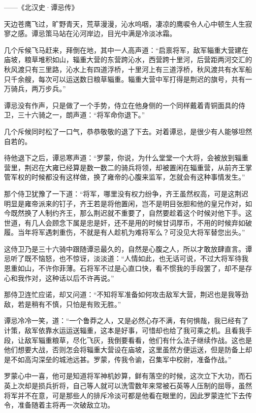 ——《北汉史·谭忌传》

天边苍鹰飞过，旷野青天，荒草漫漫，沁水呜咽，凄凉的鹰唳令人心中顿生人生寂寥之感。谭忌策马站在沁河岸边，目光中满是冷淡冰霜。

几个斥候飞马赶来，拜倒在地，其中一人高声道：“启禀将军，敌军辎重大营建在庙坡，粮草堆积如山，辎重大营的东营跨沁水，西营跨十里河，后营距两河交汇的秋风渡只有三里路，沁水上有四道浮桥，十里河上有三道浮桥，秋风渡共有水军船只千余艘，每次可以运送数日粮草辎重。辎重大营中军打得是荆迟的旗号，共有一万骑兵，两万步兵。”

谭忌没有作声，只是做了一个手势，侍立在他身侧的一个同样戴着青铜面具的侍卫，三十六骑之一，朗声道：“将军命你退下。”

几个斥候同时松了一口气，恭恭敬敬的退了下去。对着谭忌，是很少有人能够坦然自若的。

待他退下之后，谭忌寒声道：“罗蒙，你说，为什么堂堂一个大将，会被放到辎重营里，荆迟在大雍已经算是数一数二的骑兵将领，却被置闲在辎重营，从前齐王掌管军权的时候都没有这样做，换了雍帝的心腹来监军，怎就会有这种事情发生。”

那个侍卫犹豫了一下道：“将军，哪里没有权力纷争，齐王虽然权高，可是这荆迟明显是雍帝派来的钉子，齐王若是将他置闲，岂不是明目张胆和他的皇兄作对，如今既然换了人制约齐王，那么荆迟就不重要了，自然要趁着这个时候对他下手。这世道，有几人会顾念下属是忠是奸，还不是用的时候甘词厚币，不用的时候弃如破履。当年将军遇刺重伤，不就是有人趁机为难将军么？可没见大将军替您出头。”

这侍卫乃是三十六骑中跟随谭忌最久的，自然是心腹之人，所以才敢放肆直言。谭忌听了既不恼怒，也不惊讶，淡淡道：“人情如此，也无话可说，不过大将军待我恩重如山，不许你菲薄。石将军不过是心直口快，看不惯我的手段罢了，却不是存心和我作对，这种话以后不许再说。”

那侍卫连忙应诺，却又问道：“不知将军准备如何攻击敌军大营，荆迟也是我等劲敌，若是稍有不慎，只怕是有败无胜。”

谭忌冷冷一笑，道：“一个鲁莽之人，又是必然心存不满，有何惧哉，我已经有了计策，敌军依靠水运运送辎重，这本是好事，可惜却也给了我可乘之机。且看我手段，让敌军辎重粮草，尽化飞灰，我倒要看看，他们有什么法子继续作战。这也是他们想要大战，否则怎会将辎重大营设在庙坡，这里虽然方便运送，但是防备上却是不如高沟深垒的城池远甚。罗蒙，传我令谕，召集军中校尉，准备作战。”

罗蒙心中一喜，他可是知道将军神机妙算，鲜有落空的时候，这次立下大功，而石英上次却是损兵折将，自己等人就可以洗雪数年来常被石英等人压制的屈辱，虽然将军并不在意，可是那些人的排斥冷淡可都是他看在眼里的，因此罗蒙连忙下去传令，准备随着主将再一次破敌立功。

